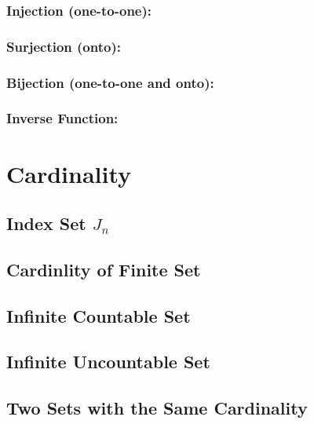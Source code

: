 \documentclass{article}
\begin{document}
\subsubsection{Injection (one-to-one):}
\vspace{40px}
\subsubsection{Surjection (onto):}
\vspace{40px}
\subsubsection{Bijection (one-to-one and onto):}
\vspace{40px}
\subsubsection{Inverse Function:}
\pagebreak
\section{Cardinality}
\subsection{Index Set $J_n$}
\vspace{30px}
\subsection{Cardinlity of Finite Set}
\vspace{30px}
\subsection{Infinite Countable Set}
\vspace{30px}
\subsection{Infinite Uncountable Set}
\vspace{30px}
\subsection{Two Sets with the Same Cardinality}
\end{document}
